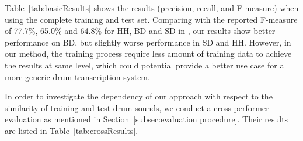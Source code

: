 \documentclass{article}
\newcommand{\secref}[1]{\mbox{Section~\ref{#1}}}
\newcommand{\tabref}[1]{\mbox{Table~\ref{#1}}}
\begin{document}
\tabref{tab:basicResults} shows the results (precision, recall, and F-measure) when using the complete training and test set.
Comparing with the reported F-measure of 77.7\%, 65.0\% and 64.8\% for HH, BD and SD in \cite{gillet_transcription_2008}, our results show better performance on BD, but slightly worse performance in SD and HH. However, in our method, the training process require less amount of training data to achieve the results at same level, which could potential provide a better use case for a more generic drum transcription system.     




In order to investigate the dependency of our approach with respect to the similarity of training and test drum sounds, we conduct a cross-performer evaluation as mentioned in \secref{subsec:evaluation procedure}. %
Their results are listed in \tabref{tab:crossResults}.
\end{document}
